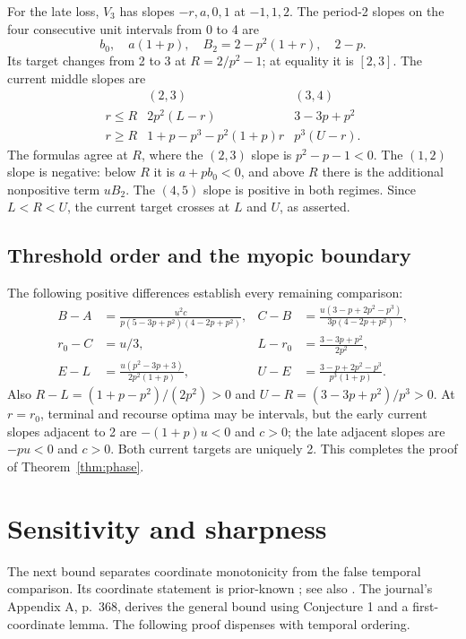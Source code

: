 \documentclass[11pt]{article}
\theoremstyle{remark}\newtheorem{remark}[theorem]{Remark}
\begin{document}
For the late loss, $V_3$ has slopes $-r,a,0,1$ at $-1,1,2$.
The period-2 slopes on the four consecutive unit intervals from 0 to 4 are
\[
 b_0,\quad a(1+p),\quad B_2=2-p^2(1+r),\quad 2-p.
\]
Its target changes from 2 to 3 at $R=2/p^2-1$; at equality it is
$[2,3]$. The current middle slopes are
\begin{equation}\label{eq:dhigh}
 \begin{array}{c|cc}
 & (2,3)&(3,4)\\\hline
 r\le R&2p^2(L-r)&3-3p+p^2\\
 r\ge R&1+p-p^3-p^2(1+p)r&p^3(U-r).
 \end{array}
\end{equation}
The formulas agree at $R$, where the $(2,3)$ slope is $p^2-p-1<0$.
The $(1,2)$ slope is negative: below $R$ it is $a+pb_0<0$, and above
$R$ there is the additional nonpositive term $uB_2$. The $(4,5)$ slope
is positive in both regimes. Since $L<R<U$, the current target crosses
at $L$ and $U$, as asserted.

\subsection{Threshold order and the myopic boundary}
The following positive differences establish every remaining comparison:
\begin{align*}
 B-A&=\frac{u^2c}{p(5-3p+p^2)(4-2p+p^2)},&
 C-B&=\frac{u(3-p+2p^2-p^3)}{3p(4-2p+p^2)},\\
 r_0-C&=u/3,& L-r_0&=\frac{3-3p+p^2}{2p^2},\\
 E-L&=\frac{u(p^2-3p+3)}{2p^2(1+p)},&
 U-E&=\frac{3-p+2p^2-p^3}{p^3(1+p)}.
\end{align*}
Also $R-L=(1+p-p^2)/(2p^2)>0$ and
$U-R=(3-3p+p^2)/p^3>0$.
At $r=r_0$, terminal and recourse optima may be intervals, but the
early current slopes adjacent to 2 are $-(1+p)u<0$ and $c>0$;
the late adjacent slopes are $-pu<0$ and $c>0$. Both current targets
are uniquely 2. This completes the proof of Theorem~\ref{thm:phase}.

\section{Sensitivity and sharpness}\label{sec:sensitivity}
The next bound separates coordinate monotonicity from the false temporal
comparison. Its coordinate statement is prior-known
\cite[Conjecture 2, p.~360]{Journal}; see also \cite{WP,Thesis}.
The journal's Appendix A, p.~368, derives the general bound using
Conjecture 1 and a first-coordinate lemma. The following proof dispenses
with temporal ordering.
\end{document}
